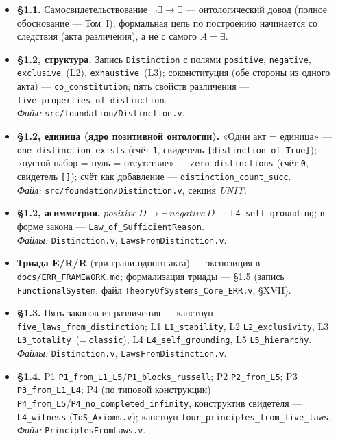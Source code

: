 \documentclass[12pt,a4paper]{article}
\begin{document}
\begin{itemize}\itemsep2pt
\item \textbf{§1.1.} Самосвидетельствование $\neg\exists\to\exists$ --- онтологический
довод (полное обоснование --- Том~I); формальная цепь по построению начинается со
следствия (акта различения), а не с самого $A=\exists$.

\item \textbf{§1.2, структура.} Запись \texttt{Distinction} с полями
\texttt{positive}, \texttt{negative}, \texttt{exclusive}~(L2), \texttt{exhaustive}~(L3);
со\-конституция (обе стороны из одного акта) --- \texttt{co\_constitution}; пять свойств
различения --- \texttt{five\_properties\_of\_distinction}.\\
\emph{Файл:} \texttt{src/foundation/Distinction.v}.

\item \textbf{§1.2, единица (ядро позитивной онтологии).} «Один акт = единица» ---
\texttt{one\_distinction\_exists} (счёт \texttt{1}, свидетель
\texttt{[distinction\_of True]}); «пустой набор = нуль = отсутствие» ---
\texttt{zero\_distinctions} (счёт \texttt{0}, свидетель \texttt{[]});
счёт как добавление --- \texttt{distinction\_count\_succ}.\\
\emph{Файл:} \texttt{src/foundation/Distinction.v}, секция \emph{UNIT}.

\item \textbf{§1.2, асимметрия.} $\mathit{positive}\,D\to\neg\,\mathit{negative}\,D$ ---
\texttt{L4\_self\_grounding}; в форме закона --- \texttt{Law\_of\_SufficientReason}.\\
\emph{Файлы:} \texttt{Distinction.v}, \texttt{LawsFromDistinction.v}.

\item \textbf{Триада E/R/R} (три грани одного акта) --- экспозиция в
\texttt{docs/ERR\_FRAMEWORK.md}; формализация триады --- §1.5 (запись
\texttt{FunctionalSystem}, файл \texttt{TheoryOfSystems\_Core\_ERR.v}, §XVII).
\item \textbf{§1.3.} Пять законов из различения --- капстоун
\texttt{five\_laws\_from\_distinction}; L1 \texttt{L1\_stability}, L2 \texttt{L2\_exclusivity},
L3 \texttt{L3\_totality}~(=\,\texttt{classic}), L4 \texttt{L4\_self\_grounding},
L5 \texttt{L5\_hierarchy}.\\
\emph{Файлы:} \texttt{Distinction.v}, \texttt{LawsFromDistinction.v}.

\item \textbf{§1.4.} P1 \texttt{P1\_from\_L1\_L5}/\texttt{P1\_blocks\_russell};
P2 \texttt{P2\_from\_L5}; P3 \texttt{P3\_from\_L1\_L4}; P4 (по типовой конструкции)
\texttt{P4\_from\_L5}/\texttt{P4\_no\_completed\_infinity}, конструктив свидетеля ---
\texttt{L4\_witness} (\texttt{ToS\_Axioms.v}); капстоун
\texttt{four\_principles\_from\_five\_laws}.\\
\emph{Файл:} \texttt{PrinciplesFromLaws.v}.


\end{itemize}
\end{document}
